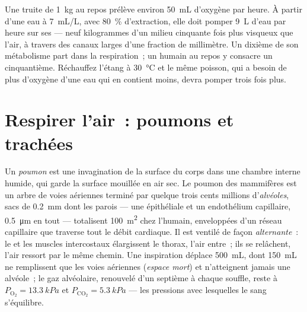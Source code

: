 \begin{example}\label{ex:b1:gas-exchange:priceofwater}
Une truite de \qty{1}{kg} au repos prélève environ \qty{50}{mL}
d'oxygène par heure. À partir d'une eau à \qty{7}{mL/L}, avec
\qty{80}{\%} d'extraction, elle doit pomper \qty{9}{L} d'eau par heure
sur ses  --- neuf kilogrammes d'un milieu cinquante fois plus
visqueux que l'air, à travers des canaux larges d'une fraction de
millimètre. Un dixième de son métabolisme part dans la respiration~;
un humain au repos y consacre un cinquantième. Réchauffez l'étang à
\qty{30}{\celsius} et le même poisson, qui a besoin de plus d'oxygène
d'une eau qui en contient moins, devra pomper trois fois plus.
\end{example}

\section{Respirer l'air~: poumons et trachées}

\begin{definition}\label{def:b1:gas-exchange:lung}
Un \emph{poumon} est une invagination de la surface du corps dans une
chambre interne humide, qui garde la surface mouillée en air sec. Le
poumon des mammifères est un arbre de voies aériennes terminé par
quelque trois cents millions d'\emph{alvéoles}, sacs de \qty{0.2}{mm}
dont les parois --- une  épithéliale et un endothélium
capillaire, \qty{0.5}{\micro m} en tout --- totalisent \qty{100}{m^2}
chez l'humain, enveloppées d'un réseau capillaire que traverse tout le
débit cardiaque. Il est ventilé de façon \emph{alternante}~: le
 et les muscles intercostaux élargissent le thorax, l'air
entre~; ils se relâchent, l'air ressort par le même chemin. Une
inspiration déplace \qty{500}{mL}, dont \qty{150}{mL} ne remplissent
que les voies aériennes (\emph{espace mort}) et n'atteignent jamais
une alvéole~; le gaz alvéolaire, renouvelé d'un septième à chaque
souffle, reste à $P_{\mathrm{O_2}} =
\qty{13.3}{kPa}$ et $P_{\mathrm{CO_2}} = \qty{5.3}{kPa}$ --- les
pressions avec lesquelles le sang s'équilibre.
\end{definition}

